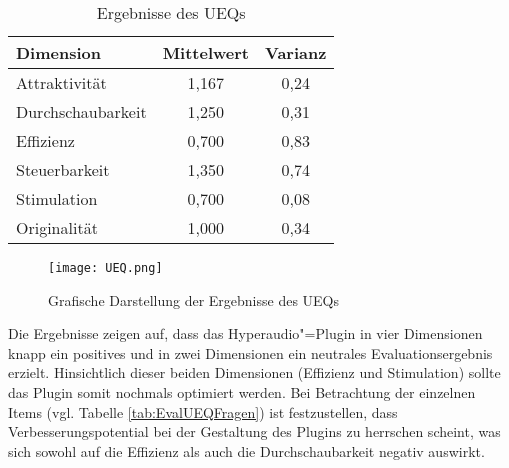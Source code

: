 \begin{table}[!ht]
\centering
\def\arraystretch{1.4}
\begin{tabularx}{0.46\textwidth}{lcc}      
    \hline
    Dimension & Mittelwert & Varianz
    \\\hline
	Attraktivität & 1,167 & 0,24\\
	Durchschaubarkeit & 1,250 & 0,31\\
	Effizienz & 0,700 & 0,83\\
	Steuerbarkeit & 1,350 & 0,74\\
	Stimulation & 0,700 & 0,08\\
	Originalität & 1,000 & 0,34\\
    \hline
    \end{tabularx}
    \caption{Ergebnisse des UEQs}
\label{tab:EvalUEQ}
\end{table}

\begin{figure}[h!]
\texttt{[image: UEQ.png]}
\caption{\label{fig:UEQ}Grafische Darstellung der Ergebnisse des UEQs}
\end{figure}

Die Ergebnisse zeigen auf, dass das Hyperaudio"=Plugin in vier Dimensionen knapp ein positives und in zwei Dimensionen ein neutrales Evaluationsergebnis erzielt. Hinsichtlich dieser beiden Dimensionen (Effizienz und Stimulation) sollte das Plugin somit nochmals optimiert werden. Bei Betrachtung der einzelnen Items (vgl. Tabelle \ref{tab:EvalUEQFragen}) ist festzustellen, dass Verbesserungspotential bei der Gestaltung des Plugins zu herrschen scheint, was sich sowohl auf die Effizienz als auch die Durchschaubarkeit negativ auswirkt.

